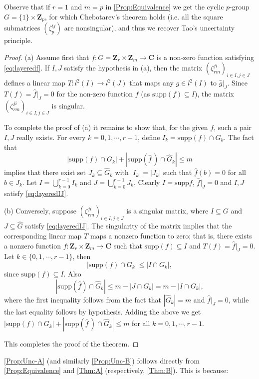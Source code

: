 \documentclass[10pt,a4paper]{amsart}
\def\Z{\mathbf{Z}}
\def\C{\mathbf{C}}
\def\supp{\mathrm{supp}}
\begin{document}
Observe that if  $r=1$  and $m=p$   in \autoref{Prop:Equivalence} we get  the  cyclic $p$-group   $G= \{1\} \times \Z_p$, for which Chebotarev's theorem holds (i.e. all the square submatrices $(\zeta_p^{ij})$ are nonsingular), and  thus we recover Tao's uncertainty principle.


\begin{proof} (a)
Assume first that  $f : G=\Z_r \times \Z_m \to \C$ is a non-zero function satisfying \eqref{eq:layeredf}. If $I, J$ satisfy the hypothesis in (a), then the matrix $(\zeta_{rm}^{ji})_{i \in I, j \in J}$ defines a linear map $T: l^2(I) \to l^2(J)$ that maps any $g \in l^2(I)$ to $\widehat{g}|_J$. Since $T(f) = \widehat{f} |_J = 0$ for the non-zero function $f$ (as $\supp(f) \subseteq I$), the matrix $(\zeta_{rm}^{ji})_{i \in I, j \in J}$ is singular.

To complete the proof of (a) it remains  to show that, for the given $f$,  such a pair $I, J$ 
really exists. For every  $k =0, 1, \cdots , r-1$, define $I_k = \supp(f) \cap G_k$. The fact that 
\[
|\supp(f) \cap G_k| + |\supp(\widehat{f} \, ) \cap \widehat{G}_k| \leq m 
\]
implies that there exist set $J_k \subseteq \widehat{G}_k$ with $|I_k| = |J_k|$ such that $\widehat f (b) = 0$ for all $b \in J_k$. Let $I = \bigcup_{k=0}^{r-1} I_k $ and $J = \bigcup_{k=0}^{r-1} J_k$. Clearly $I = \supp{f}$, $\widehat{f}|_J=0$ and $I, J$ satisfy \eqref{eq:layeredIJ}.


(b) Conversely, suppose $(\zeta_{rm}^{ji})_{i \in I, j \in J}$ is a singular matrix, where $I \subseteq G$ and $ J  \subseteq  \widehat{G}$   satisfy \eqref{eq:layeredIJ}.  The singularity of the matrix implies that the corresponding linear map $T$ maps a nonzero function to zero; that is, there exists a nonzero function $f: \Z_r \times \Z_m \to \C$ such that $\supp(f)  \subseteq I$ and $T( f)  = \widehat{f} |_J= 0$.
Let   $k  \in \{  0,1, \cdots ,r-1\} $, then 
\[
|\supp(f) \cap G_k| \leq  |I \cap G_k |, 
\]
since  $\supp(f)  \subseteq I$. Also 
\[
|\supp(\widehat{f}) \cap \widehat{G}_k| \leq m- |J \cap G_k| = m - |I \cap G_k|, 
\]
where the first inequality follows from the fact that $ |\widehat{G}_k|= m$ and  $\widehat{f}|_{J}= 0$, while the last equality follows  by hypothesis. 
Adding the above we get $|\supp(f) \cap G_k| + |\supp(\widehat{f} \, ) \cap \widehat{G}_k| \leq m$ for all $k=0, 1, \cdots, r-1$.


This completes the proof of the theorem.
\end{proof}

\autoref{Prop:Unc-A} (and similarly \autoref{Prop:Unc-B}) follows directly from \autoref{Prop:Equivalence} and \autoref{Thm:A} (respectively, \autoref{Thm:B}). This is because:
\end{document}

